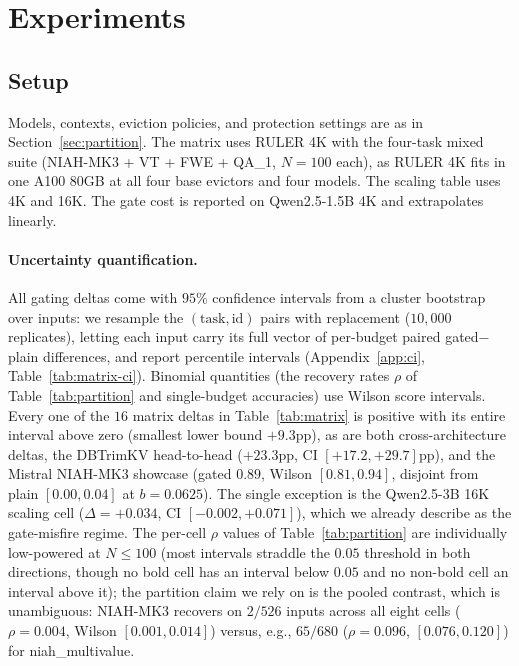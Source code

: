 \documentclass{article}
\begin{document}
\section{Experiments}
\label{sec:experiments}

\subsection{Setup}

Models, contexts, eviction policies, and protection settings are as in
Section~\ref{sec:partition}. The matrix uses RULER 4K with the four-task
mixed suite (NIAH-MK3 + VT + FWE + QA\_1, $N = 100$ each), as RULER 4K
fits in one A100 80GB at all four base evictors and four models. The
scaling table uses 4K and 16K. The gate cost is reported on Qwen2.5-1.5B
4K and extrapolates linearly.

\paragraph{Uncertainty quantification.} All gating deltas come with $95\%$
confidence intervals from a cluster bootstrap over inputs: we resample the
$(\text{task}, \text{id})$ pairs with replacement ($10{,}000$ replicates),
letting each input carry its full vector of per-budget paired
gated$-$plain differences, and report percentile intervals
(Appendix~\ref{app:ci}, Table~\ref{tab:matrix-ci}). Binomial quantities (the
recovery rates $\rho$ of Table~\ref{tab:partition} and single-budget
accuracies) use Wilson score intervals. Every one of the $16$ matrix deltas
in Table~\ref{tab:matrix} is positive with its entire interval above zero
(smallest lower bound $+9.3$pp), as are both cross-architecture deltas, the
DBTrimKV head-to-head ($+23.3$pp, CI $[+17.2, +29.7]$pp), and the Mistral
NIAH-MK3 showcase (gated $0.89$, Wilson $[0.81, 0.94]$, disjoint from plain
$[0.00, 0.04]$ at $b = 0.0625$). The single exception is the Qwen2.5-3B 16K
scaling cell ($\Delta = +0.034$, CI $[-0.002, +0.071]$), which we already
describe as the gate-misfire regime. The per-cell $\rho$ values of
Table~\ref{tab:partition} are individually low-powered at $N \le 100$ (most
intervals straddle the $0.05$ threshold in both directions, though no bold
cell has an interval below $0.05$ and no non-bold cell an interval above
it); the partition claim we rely on is the pooled contrast, which is
unambiguous: NIAH-MK3 recovers on $2/526$ inputs across all eight cells
($\rho = 0.004$, Wilson $[0.001, 0.014]$) versus, e.g., $65/680$
($\rho = 0.096$, $[0.076, 0.120]$) for niah\_multivalue.
\end{document}
